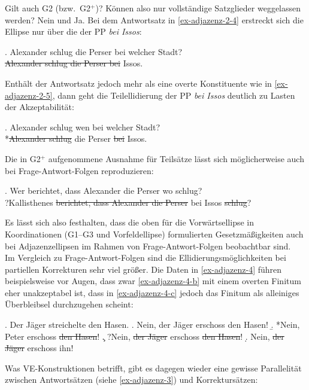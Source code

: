 Gilt auch G2 (bzw.\ G2$^+$)? Können also nur vollständige Satzglieder weggelassen werden? Nein und Ja. Bei dem Antwortsatz in \ref{ex-adjazenz-2-4} erstreckt sich die Ellipse nur über die  der PP {\it bei Issos}:  

\ex. \label{ex-adjazenz-2-4} Alexander schlug die Perser bei welcher Stadt? \\
 \sout{Alexander schlug die Perser bei} Issos.

Enthält der Antwortsatz jedoch mehr als eine overte Konstituente wie in \ref{ex-adjazenz-2-5}, dann geht die Teilellidierung der PP {\it bei Issos} deutlich zu Lasten der Akzeptabilität: 

\ex. Alexander schlug wen bei welcher Stadt?\label{ex-adjazenz-2-5}  \\
 *\sout{Alexander schlug} die Perser \sout{bei} Issos.
 
Die in G2$^+$ aufgenommene Ausnahme für Teilsätze lässt sich möglicherweise auch bei Frage-Antwort-Folgen reproduzieren:

\ex. \label{ex-adjazenz-2-9} Wer berichtet, dass Alexander die Perser wo schlug? \\
?Kallisthenes \sout{berichtet, dass Alexander die Perser} bei Issos \sout{schlug}?

Es lässt sich also festhalten, dass die oben für die Vorwärtsellipse in Koordinationen (G1--G3 und Vorfeldellipse)  formulierten Gesetzmä\ss igkeiten auch bei Adjazenzellipsen im Rahmen von Frage-Antwort-Folgen beobachtbar sind. \\

Im Vergleich zu Frage-Antwort-Folgen sind die Ellidierungsmöglichkeiten bei partiellen Korrekturen sehr viel grö\ss er. Die Daten in \ref{ex-adjazenz-4} führen beispielsweise vor Augen, dass zwar \ref{ex-adjazenz-4-b} mit einem overten Finitum eher unakzeptabel ist, dass in \ref{ex-adjazenz-4-c} jedoch das Finitum als alleiniges Überbleibsel durchzugehen scheint:   

\ex. \label{ex-adjazenz-4}Der Jäger streichelte den Hasen.
\a. Nein, der Jäger erschoss den Hasen!
\b. *Nein, Peter erschoss \sout{den Hasen}!\label{ex-adjazenz-4-b}
\c. ?Nein, \sout{der Jäger} erschoss \sout{den Hasen}!\label{ex-adjazenz-4-c}
\d. Nein, \sout{der Jäger} erschoss ihn!

Was VE-Konstruktionen betrifft, gibt es dagegen wieder eine gewisse Parallelität zwischen Antwortsätzen (siehe \ref{ex-adjazenz-3}) und Korrektursätzen: 

